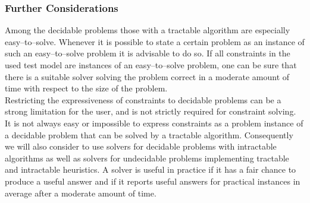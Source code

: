 \subsubsection{Further Considerations}
Among the decidable problems those with a tractable algorithm are especially easy--to--solve. Whenever it is possible to state a certain problem as an instance of such an easy--to--solve problem it is advisable to do so. If all constraints in the used test model are instances of an easy--to--solve problem, one can be sure that there is a suitable solver solving the problem correct in a moderate amount of time with respect to the size of the problem.\\
Restricting the expressiveness of constraints to decidable problems can be a strong limitation for the user, and is not strictly required for constraint solving. It is not always easy or impossible to express constraints as a problem instance of a decidable problem that can be solved by a tractable algorithm. Consequently we will also consider to use solvers for decidable problems with intractable algorithms as well as solvers for undecidable problems implementing tractable and intractable heuristics. A solver is useful in practice if it has a fair chance to produce a useful answer and if it reports useful answers for practical instances in average after a moderate amount of time. 
% 
% 
% 
% 

